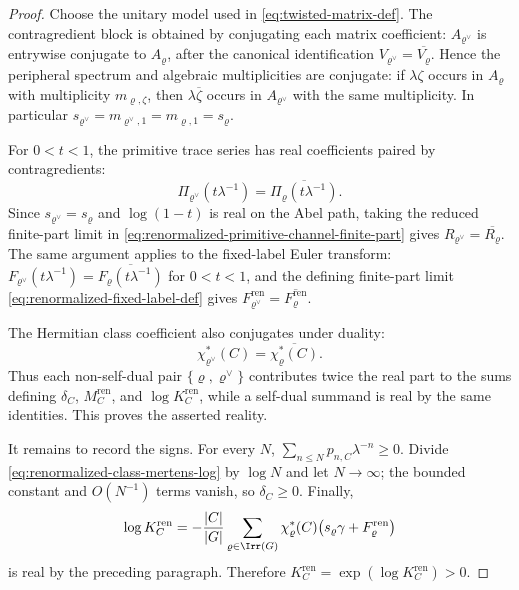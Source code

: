 \begin{proof}
  Choose the unitary model used in \eqref{eq:twisted-matrix-def}.  The
  contragredient block is obtained by conjugating each matrix coefficient:
  \(A_{\varrho^\vee}\) is entrywise conjugate to \(A_\varrho\), after the
  canonical identification \(V_{\varrho^\vee}=\overline{V_\varrho}\).
  Hence the peripheral spectrum and algebraic multiplicities are conjugate:
  if \(\lambda\zeta\) occurs in \(A_\varrho\) with multiplicity
  \(m_{\varrho,\zeta}\), then
  \(\lambda\overline\zeta\) occurs in \(A_{\varrho^\vee}\) with the same
  multiplicity.  In particular
  \(s_{\varrho^\vee}=m_{\varrho^\vee,1}=m_{\varrho,1}=s_\varrho\).

  For \(0<t<1\), the primitive trace series has real coefficients paired by
  contragredients:
  \[
    \Pi_{\varrho^\vee}(t\lambda^{-1})
    =
    \overline{\Pi_\varrho(t\lambda^{-1})}.
  \]
  Since \(s_{\varrho^\vee}=s_\varrho\) and \(\log(1-t)\) is real on the Abel
  path, taking the reduced finite-part limit in
  \eqref{eq:renormalized-primitive-channel-finite-part} gives
  \(R_{\varrho^\vee}=\overline{R_\varrho}\).  The same argument applies to
  the fixed-label Euler transform:
  \(F_{\varrho^\vee}(t\lambda^{-1})
  =\overline{F_\varrho(t\lambda^{-1})}\) for \(0<t<1\), and the defining
  finite-part limit \eqref{eq:renormalized-fixed-label-def} gives
  \(F_{\varrho^\vee}^{\mathrm{ren}}
  =\overline{F_\varrho^{\mathrm{ren}}}\).

  The Hermitian class coefficient also conjugates under duality:
  \[
    \chi_{\varrho^\vee}^\ast(C)
    =
    \overline{\chi_\varrho^\ast(C)}.
  \]
  Thus each non-self-dual pair
  \(\{\varrho,\varrho^\vee\}\) contributes twice the real part to the sums
  defining \(\delta_C\), \(M_C^{\mathrm{ren}}\), and
  \(\log K_C^{\mathrm{ren}}\), while a self-dual summand is real by the same
  identities.  This proves the asserted reality.

  It remains to record the signs.  For every \(N\),
  \(\sum_{n\le N}p_{n,C}\lambda^{-n}\ge0\).  Divide
  \eqref{eq:renormalized-class-mertens-log} by \(\log N\) and let
  \(N\to\infty\); the bounded constant and \(O(N^{-1})\) terms vanish, so
  \(\delta_C\ge0\).  Finally,
  \[
    \log K_C^{\mathrm{ren}}
    =
    -\frac{|C|}{|G|}
      \sum_{\varrho\in\Irr(G)}
        \chi_\varrho^\ast(C)
        \bigl(s_\varrho\gamma+F_\varrho^{\mathrm{ren}}\bigr)
  \]
  is real by the preceding paragraph.  Therefore
  \(K_C^{\mathrm{ren}}=\exp(\log K_C^{\mathrm{ren}})>0\).
\end{proof}

